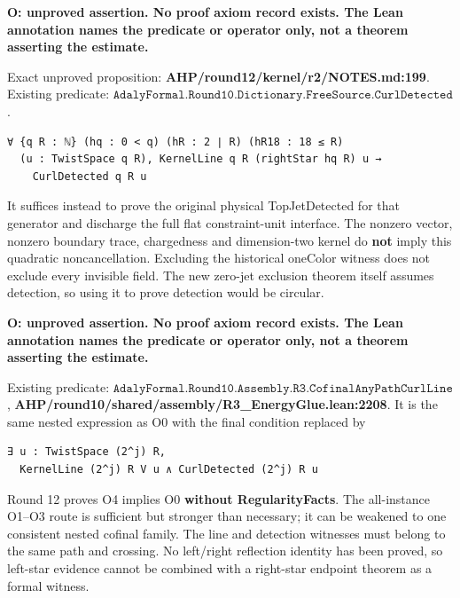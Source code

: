 \begin{theorem}
\label{open-detection}
\textbf{O: unproved assertion. No proof axiom record exists. The Lean annotation names the predicate or operator only, not a theorem asserting the estimate.}

Exact unproved proposition: \textbf{AHP/round12/kernel/r2/NOTES.md:199}. Existing predicate: \(\texttt{AdalyFormal.Round10.Dictionary.FreeSource.CurlDetected}\).



\begin{verbatim}
∀ {q R : ℕ} (hq : 0 < q) (hR : 2 ∣ R) (hR18 : 18 ≤ R)
  (u : TwistSpace q R), KernelLine q R (rightStar hq R) u →
    CurlDetected q R u
\end{verbatim}


It suffices instead to prove the original physical TopJetDetected for that generator and discharge the full flat constraint-unit interface. The nonzero vector, nonzero boundary trace, chargedness and dimension-two kernel do \textbf{not} imply this quadratic noncancellation. Excluding the historical oneColor witness does not exclude every invisible field. The new zero-jet exclusion theorem itself assumes detection, so using it to prove detection would be circular.


\end{theorem}


\begin{theorem}
\label{open-curlline}
\textbf{O: unproved assertion. No proof axiom record exists. The Lean annotation names the predicate or operator only, not a theorem asserting the estimate.}

Existing predicate: \(\texttt{AdalyFormal.Round10.Assembly.R3.CofinalAnyPathCurlLine}\), \textbf{AHP/round10/shared/assembly/R3\_EnergyGlue.lean:2208}. It is the same nested expression as O0 with the final condition replaced by



\begin{verbatim}
∃ u : TwistSpace (2^j) R,
  KernelLine (2^j) R V u ∧ CurlDetected (2^j) R u
\end{verbatim}


Round 12 proves O4 implies O0 \textbf{without RegularityFacts}. The all-instance O1–O3 route is sufficient but stronger than necessary; it can be weakened to one consistent nested cofinal family. The line and detection witnesses must belong to the same path and crossing. No left/right reflection identity has been proved, so left-star evidence cannot be combined with a right-star endpoint theorem as a formal witness.


\end{theorem}
